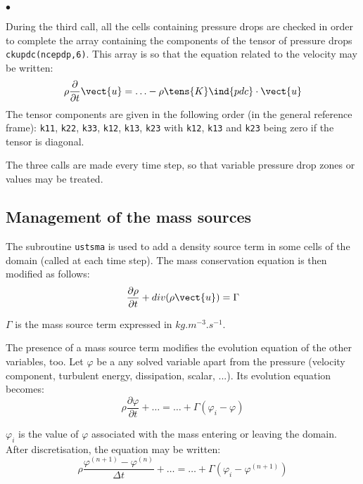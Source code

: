 {{{\begin{list}{$\bullet$}{}
\item During the third call, all the cells containing pressure drops
      are checked in order to complete the array
      containing the components of the tensor of pressure drops
      \mbox{\texttt{ckupdc(ncepdp,6)}}. This array is so that
      the equation related to the velocity may be written:
\begin{displaymath}
\rho\frac{\partial}{\partial t}\vect{u}=\ldots -\rho\tens{K}\ind{pdc}\cdot\vect{u}
\end{displaymath}
The tensor components are given in the following order (in the general
      reference frame): \texttt{k11}, \texttt{k22}, \texttt{k33}, \texttt{k12},
      \texttt{k13}, \texttt{k23} with \texttt{k12}, \texttt{k13} and \texttt{k23}
      being zero if the tensor is diagonal.

\end{list}


The three calls are made every time step, so that variable pressure drop
zones or values may be treated.

\subsection{Management of the mass sources}

The subroutine \texttt{ustsma} is used to add a density source term in some cells of
the domain (called at each time step). The mass conservation equation is then modified as follows:
\begin{displaymath}
\frac{\partial \rho}{\partial t} + div(\rho\vect{u})=\Gamma
\end{displaymath}

$\Gamma$ is the mass source term expressed in $kg.m^{-3}.s^{-1}$.

The presence of a mass source term modifies the evolution equation of
the other variables, too. Let $\varphi$ be a any solved variable apart
from the pressure (velocity component, turbulent energy, dissipation,
scalar, ...). Its evolution equation becomes:
\begin{displaymath}
\rho\frac{\partial \varphi}{\partial t} + \ldots = \ldots + \Gamma(\varphi_i-\varphi)
\end{displaymath}

$\varphi_i$ is the value of $\varphi$ associated with the mass entering
or leaving the domain. After discretisation, the equation may be written:
\begin{displaymath}
\rho\frac{\varphi^{(n+1)}-\varphi^{(n)}}{\Delta t} + \ldots
= \ldots + \Gamma(\varphi_i-\varphi^{(n+1)})
\end{displaymath}

}}}
